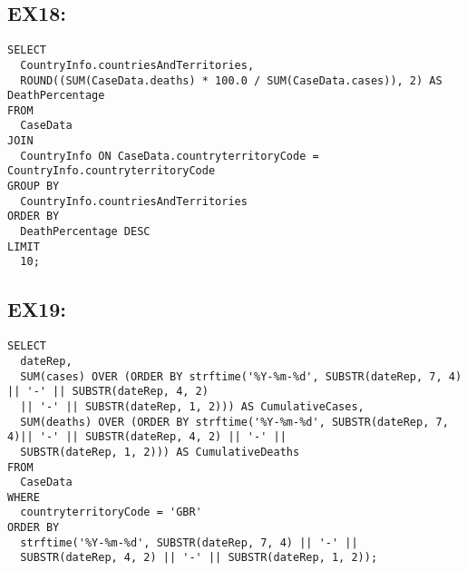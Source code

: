 \documentclass{article}
\begin{document}
\subsection{EX18:}



\begin{verbatim}
SELECT
  CountryInfo.countriesAndTerritories,
  ROUND((SUM(CaseData.deaths) * 100.0 / SUM(CaseData.cases)), 2) AS DeathPercentage
FROM
  CaseData
JOIN
  CountryInfo ON CaseData.countryterritoryCode = CountryInfo.countryterritoryCode
GROUP BY
  CountryInfo.countriesAndTerritories
ORDER BY
  DeathPercentage DESC
LIMIT
  10;
\end{verbatim}

\newpage

\subsection{EX19:}

\begin{verbatim}
SELECT
  dateRep,
  SUM(cases) OVER (ORDER BY strftime('%Y-%m-%d', SUBSTR(dateRep, 7, 4) || '-' || SUBSTR(dateRep, 4, 2)
  || '-' || SUBSTR(dateRep, 1, 2))) AS CumulativeCases,
  SUM(deaths) OVER (ORDER BY strftime('%Y-%m-%d', SUBSTR(dateRep, 7, 4)|| '-' || SUBSTR(dateRep, 4, 2) || '-' ||
  SUBSTR(dateRep, 1, 2))) AS CumulativeDeaths
FROM
  CaseData
WHERE
  countryterritoryCode = 'GBR'
ORDER BY
  strftime('%Y-%m-%d', SUBSTR(dateRep, 7, 4) || '-' ||
  SUBSTR(dateRep, 4, 2) || '-' || SUBSTR(dateRep, 1, 2));
\end{verbatim}
\end{document}
